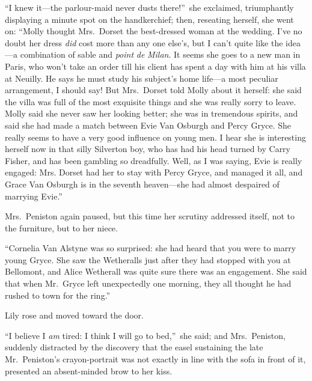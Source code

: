 \documentclass[12pt,a4paper]{book}
\begin{document}
``I knew it---the parlour-maid never dusts there!''\ she exclaimed,
triumphantly displaying a minute spot on the handkerchief; then,
reseating herself, she went on: ``Molly thought Mrs.\ Dorset the
best-dressed woman at the wedding. I've no doubt her dress \textit{did}
cost more than any one else's, but I can't quite like the idea---a
combination of sable and \textit{point} \textit{de} \textit{Milan}. It seems she goes to a
new man in Paris, who won't take an order till his client has
spent a day with him at his villa at Neuilly. He says he must
study his subject's home life---a most peculiar
arrangement, I should say! But Mrs.\ Dorset told Molly about it
herself: she said the villa was full of the most exquisite things
and she was really sorry to leave. Molly said she never saw her
looking better; she was in tremendous spirits, and said she had
made a match between Evie Van Osburgh and Percy Gryce. She really
seems to have a very good influence on young men. I hear she is
interesting herself now in that silly Silverton boy, who has had
his head turned by Carry Fisher, and has been gambling so
dreadfully. Well, as I was saying, Evie is really engaged: Mrs.
Dorset had her to stay with Percy Gryce, and managed it all, and
Grace Van Osburgh is in the seventh heaven---she had almost
despaired of marrying Evie.''





Mrs.\ Peniston again paused, but this time her scrutiny addressed
itself, not to the furniture, but to her niece.





``Cornelia Van Alstyne was so surprised: she had heard that you
were to marry young Gryce. She saw the Wetheralls just after they
had stopped with you at Bellomont, and Alice Wetherall was quite
sure there was an engagement. She said that when Mr.\ Gryce left
unexpectedly one morning, they all thought he had rushed to town
for the ring.''





Lily rose and moved toward the door.





``I believe I \textit{am} tired: I think I will go to bed,''\ she said; and
Mrs.\ Peniston, suddenly distracted by the discovery that the
easel sustaining the late Mr.\ Peniston's crayon-portrait was not
exactly in line with the sofa in front of it, presented an
absent-minded brow to her kiss.
\end{document}
